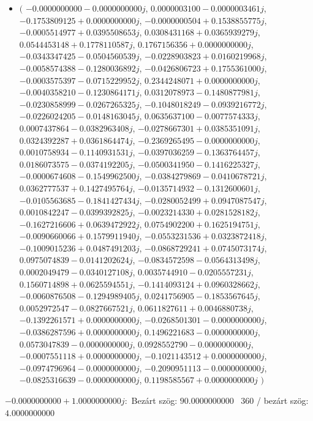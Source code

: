 \documentclass[14pt,a4paper]{article}
\begin{document}
\begin{itemize}
\item
$\big($
$-0.0000000000-0.0000000000j$, $0.0000003100-0.0000003461j$, $-0.1753809125+0.0000000000j$, $-0.0000000504+0.1538855775j$, $-0.0005514977+0.0395508653j$, $0.0308431168+0.0365939279j$, $0.0544453148+0.1778110587j$, $0.1767156356+0.0000000000j$, $-0.0343347425-0.0504560539j$, $-0.0228903823+0.0160219968j$, $-0.0058574388-0.1280036892j$, $-0.0426806723+0.1755361000j$, $-0.0003575397-0.0715229952j$, $0.2344248071+0.0000000000j$, $-0.0040358210-0.1230864171j$, $0.0312078973-0.1480877981j$, $-0.0230858999-0.0267265325j$, $-0.1048018249-0.0939216772j$, $-0.0226024205-0.0148163045j$, $0.0635637100-0.0077574333j$, $0.0007437864-0.0382963408j$, $-0.0278667301+0.0385351091j$, $0.0324392287+0.0361864474j$, $-0.2369265495-0.0000000000j$, $0.0010758934-0.1140931531j$, $-0.0397036259-0.1363764457j$, $0.0186073575-0.0374192205j$, $-0.0500341950-0.1416225327j$, $-0.0000674608-0.1549962500j$, $-0.0384279869-0.0410678721j$, $0.0362777537+0.1427495764j$, $-0.0135714932-0.1312600601j$, $-0.0105563685-0.1841427434j$, $-0.0280052499+0.0947087547j$, $0.0010842247-0.0399392825j$, $-0.0023214330+0.0281528182j$, $-0.1627216606+0.0639472922j$, $0.0754902200+0.1625194751j$, $-0.0090660066+0.1579911940j$, $-0.0553231536+0.0323872418j$, $-0.1009015236+0.0487491203j$, $-0.0868729241+0.0745073174j$, $0.0975074839-0.0141202624j$, $-0.0834572598-0.0564313498j$, $0.0002049479-0.0340127108j$, $0.0035744910-0.0205557231j$, $0.1560714898+0.0625594551j$, $-0.1414093124+0.0960328662j$, $-0.0060876508-0.1294989405j$, $0.0241756905-0.1853567645j$, $0.0052972547-0.0827667521j$, $0.0611827611+0.0046880738j$, $-0.1392261571+0.0000000000j$, $-0.0268501301-0.0000000000j$, $-0.0386287596+0.0000000000j$, $0.1496221683-0.0000000000j$, $0.0573047839-0.0000000000j$, $0.0928552790-0.0000000000j$, $-0.0007551118+0.0000000000j$, $-0.1021143512+0.0000000000j$, $-0.0974796964-0.0000000000j$, $-0.2090951113-0.0000000000j$, $-0.0825316639-0.0000000000j$, $0.1198585567+0.0000000000j$
$\big)$
\end{itemize}
$-0.0000000000+1.0000000000j$:\
Bezárt szög: $90.0000000000$ \
360 / bezárt szög: $4.0000000000$\
\end{document}
